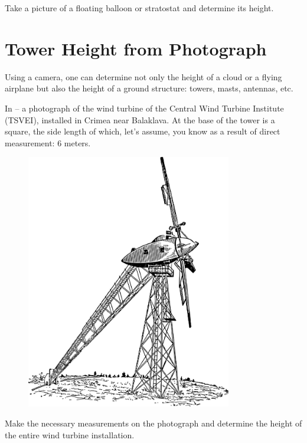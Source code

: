 Take a picture of a floating balloon or stratostat and determine its height.


\section{Tower Height from Photograph}

\ques Using a camera, one can determine not only the height of a cloud or a flying airplane but also the height of a ground structure: towers, masts, antennas, etc.

In  -- a photograph of the wind turbine of the Central Wind Turbine Institute (TSVEI), installed in Crimea near Balaklava. At the base of the tower is a square, the side length of which, let's assume, you know as a result of direct measurement: 6 meters.

\begin{figure}[h!]
\centering
\includegraphics[width=0.8\textwidth]{figures/ch-03/fig-078.pdf}
\end{figure}

Make the necessary measurements on the photograph and determine the height of the entire wind turbine installation.


